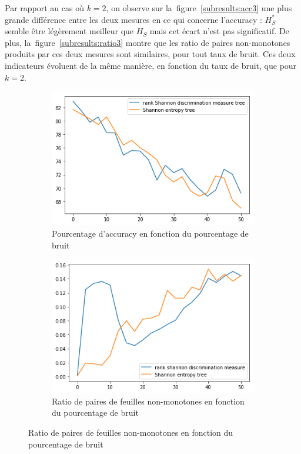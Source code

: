 \documentclass[a4paper]{article}
\newcommand{\figref}[1]{figure~\ref{#1}}
\begin{document}
Par rapport au cas où $k=2$, on observe sur la~\figref{subresults:acc3} une plus
grande différence entre les deux mesures en ce qui concerne l'accuracy : $H^*_S$
semble être légèrement meilleur que $H_S$ mais cet écart n'est pas significatif.
De plus, la~\figref{subresults:ratio3} montre que les ratio de paires
non-monotones produits par ces deux mesures sont similaires, pour tout taux de
bruit. Ces deux indicateurs évoluent de la même manière, en fonction du taux de
bruit, que pour $k=2$.

\begin{figure}[H]
    \centering
    \begin{subfigure}[c]{0.46\textwidth}
        \centering
        \includegraphics[width=\textwidth]{images/cci_5.png}
        \caption{Pourcentage d'accuracy en fonction du pourcentage de bruit}
    \label{subresults:acc5}
    \end{subfigure}
    \begin{subfigure}[c]{0.46\textwidth}
        \centering
        \includegraphics[width=\textwidth]{images/ratio_5.png}
        \caption{Ratio de paires de feuilles non-monotones en fonction du pourcentage de bruit}
    \label{subresults:ratio5}
    \end{subfigure}
    

\end{figure}
\end{document}
